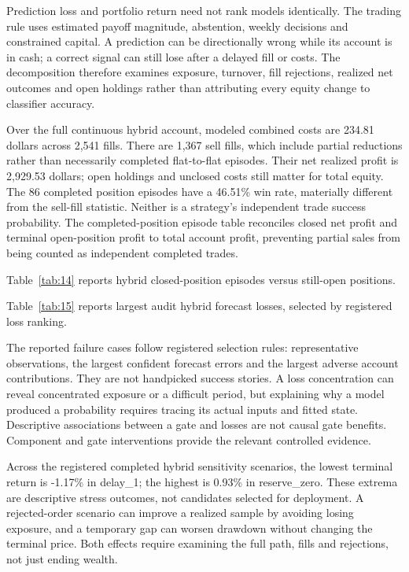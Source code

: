 Prediction loss and portfolio return need not rank models identically. The trading rule uses estimated payoff magnitude, abstention, weekly decisions and constrained capital. A prediction can be directionally wrong while its account is in cash; a correct signal can still lose after a delayed fill or costs. The decomposition therefore examines exposure, turnover, fill rejections, realized net outcomes and open holdings rather than attributing every equity change to classifier accuracy.

Over the full continuous hybrid account, modeled combined costs are 234.81 dollars across 2,541 fills. There are 1,367 sell fills, which include partial reductions rather than necessarily completed flat-to-flat episodes. Their net realized profit is 2,929.53 dollars; open holdings and unclosed costs still matter for total equity. The 86 completed position episodes have a 46.51\% win rate, materially different from the sell-fill statistic. Neither is a strategy's independent trade success probability. The completed-position episode table reconciles closed net profit and terminal open-position profit to total account profit, preventing partial sales from being counted as independent completed trades.

\noindent Table~\ref{tab:14} reports hybrid closed-position episodes versus still-open positions.



\noindent Table~\ref{tab:15} reports largest audit hybrid forecast losses, selected by registered loss ranking.



The reported failure cases follow registered selection rules: representative observations, the largest confident forecast errors and the largest adverse account contributions. They are not handpicked success stories. A loss concentration can reveal concentrated exposure or a difficult period, but explaining why a model produced a probability requires tracing its actual inputs and fitted state. Descriptive associations between a gate and losses are not causal gate benefits. Component and gate interventions provide the relevant controlled evidence.

Across the registered completed hybrid sensitivity scenarios, the lowest terminal return is -1.17\% in delay\_1; the highest is 0.93\% in reserve\_zero. These extrema are descriptive stress outcomes, not candidates selected for deployment. A rejected-order scenario can improve a realized sample by avoiding losing exposure, and a temporary gap can worsen drawdown without changing the terminal price. Both effects require examining the full path, fills and rejections, not just ending wealth.

